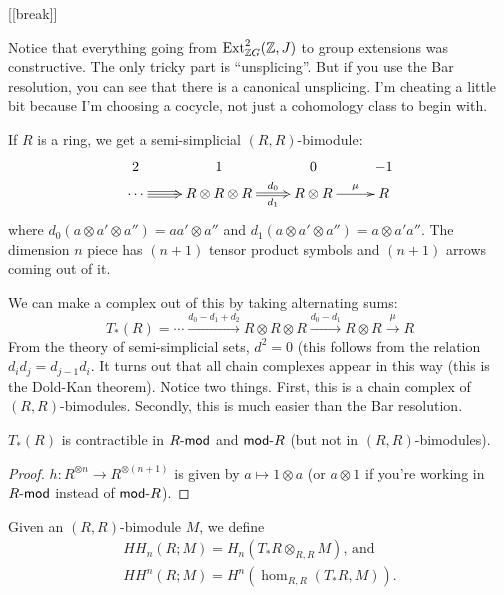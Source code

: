 [[break]]

\begin{remark}
 Notice that everything going from $\ext^2_{\ZZ G}(\ZZ,J)$ to group extensions was constructive. The only tricky part is ``unsplicing''. But if you use the Bar resolution, you can see that there is a canonical unsplicing. I'm cheating a little bit because I'm choosing a cocycle, not just a cohomology class to begin with.
\end{remark}


If $R$ is a ring, we get a semi-simplicial $(R,R)$-bimodule:
\[\xymatrix @R-1.5pc{
 2 & 1 & 0 & -1\\
 \cdots\ar@3{->}[r] & R\otimes R\otimes R\ar@{=>}[r]^-{d_0}_-{d_1} & R\otimes R\ar[r]^-\mu & R 
}\]
where $d_0(a\otimes a'\otimes a'')=aa'\otimes a''$ and $d_1(a\otimes a'\otimes a'')=a\otimes a'a''$. The dimension $n$ piece has $(n+1)$ tensor product symbols and $(n+1)$ arrows coming out of it.

We can make a complex out of this by taking alternating sums:
\[
 T_*(R)=\cdots \xrightarrow{d_0-d_1+d_2} R\otimes R\otimes R\xrightarrow{d_0-d_1} R\otimes R\xrightarrow\mu R
\]
From the theory of semi-simplicial sets, $d^2=0$ (this follows from the relation $d_id_j=d_{j-1}d_i$. It turns out that all chain complexes appear in this way (this is the Dold-Kan theorem). Notice two things. First, this is a chain complex of $(R,R)$-bimodules. Secondly, this is much easier than the Bar resolution.
\begin{lemma}
 $T_*(R)$ is contractible in $R\mod$ and $\rmod R$ (but not in $(R,R)$-bimodules).
\end{lemma}
\begin{proof}
 $h\colon R^{\otimes n}\to R^{\otimes(n+1)}$ is given by $a\mapsto 1\otimes a$ (or $a\otimes 1$ if you're working in $R\mod$ instead of $\rmod R$).
\end{proof}
\begin{definition}
 Given an $(R,R)$-bimodule $M$, we define
 \begin{align*}
  HH_n(R;M)=H_n(T_*R\otimes_{R,R} M)\text{, and}\\ HH^n(R;M)=H^n(\hom_{R,R}(T_*R,M)).
 \end{align*}
\end{definition}




